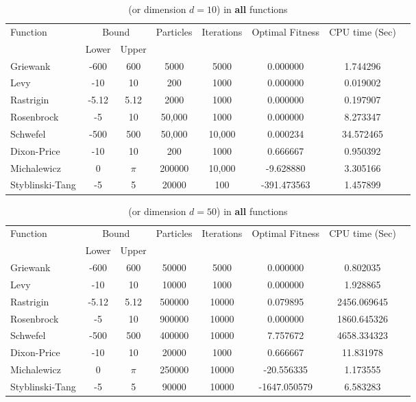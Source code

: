 \documentclass[12pt]{article}
\begin{document}
	\begin{table}[H]
		\caption{ (or dimension $d=10$) in \textbf{all} functions}
		\label{table:1}
		\centering
		\begin{tabular}{l c c c c c c c}
			\hline
			Function &  \multicolumn{2}{c}{Bound} & Particles & Iterations &  Optimal Fitness & CPU time (Sec) \\
			& Lower& Upper&&&\\
			\hline
			Griewank  		&  -600   & 600 	& 5000& 5000&  0.000000& 1.744296 &\\
			Levy 	  		&  -10    & 10 		&200 &1000 & 0.000000 &0.019002 &\\
			Rastrigin 		&  -5.12  & 5.12 	&2000 &1000 & 0.000000 & 0.197907&\\
			Rosenbrock		&  -5     & 10 		&50,000 &1000 & 0.000000 &8.273347 &\\
			Schwefel 	 	&  -500   & 500 	&50,000 &10,000 &0.000234 &34.572465 &\\
			Dixon-Price 	&   -10	  & 10 		&200 &1000 &0.666667 &0.950392 &\\
			Michalewicz 	&   0 	  & $\pi$ 	&200000 &10,000 &-9.628880 &3.305166 &\\
			Styblinski-Tang & -5 	  & 5  		&20000 &100 &-391.473563 &1.457899 &\\
			\hline
		\end{tabular}
	\end{table}
	
	
	\begin{table}[H]
		\caption{ (or dimension $d=50$) in \textbf{all} functions}
		\label{table:1}
		\centering
		\begin{tabular}{l c c c c c c c}
			\hline
			Function &  \multicolumn{2}{c}{Bound} & Particles & Iterations &  Optimal Fitness & CPU time (Sec) \\
			& Lower& Upper&&&\\
			\hline
			Griewank  & -600 & 600 & 50000 & 5000 & 0.000000 & 0.802035  \\
			Levy      & -10  & 10  & 10000 & 1000 & 0.000000 & 1.928865 \\
			Rastrigin & -5.12 & 5.12 & 500000 & 10000 & 0.079895 & 2456.069645 \\
			Rosenbrock& -5   & 10  & 900000 & 10000 & 0.000000 & 1860.645326 \\
			Schwefel  & -500 & 500 & 400000 & 10000 & 7.757672 & 4658.334323 \\
			Dixon-Price & -10 & 10  & 20000 & 1000 & 0.666667 & 11.831978 \\
			Michalewicz & 0  & $\pi$ & 250000 & 10000 & -20.556335 & 1.173555  \\
			Styblinski-Tang & -5 & 5 & 90000 & 10000 & -1647.050579 &  6.583283 \\
			\hline
		\end{tabular}
	\end{table}
	
\end{document}
